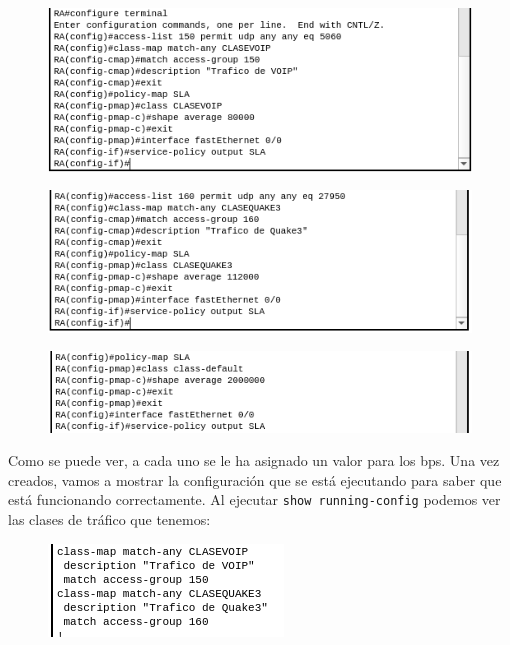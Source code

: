 \documentclass[11pt,a4paper]{article}
\begin{document}
\begin{figure}[H]
	\centering
	\includegraphics[scale=0.7]{img/voip-ej5.png}
\end{figure}

\begin{figure}[H]
	\centering
	\includegraphics[scale=0.7]{img/quake-ej5.png}
\end{figure}

\begin{figure}[H]
	\centering
	\includegraphics[scale=0.7]{img/class-default-ej5.png}
\end{figure}

Como se puede ver, a cada uno se le ha asignado un valor para los bps. Una vez creados, vamos a mostrar la configuración que se está ejecutando para saber que está funcionando correctamente. Al ejecutar \texttt{show running-config} podemos ver las clases de tráfico que tenemos:

\begin{figure}[H]
	\centering
	\includegraphics[scale=0.7]{img/classess-ej5.png}
\end{figure}
\end{document}
